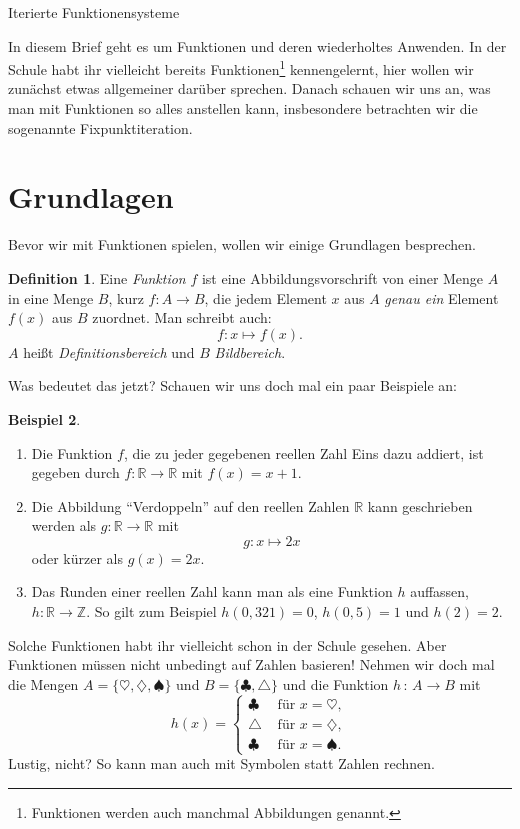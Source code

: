 \documentclass[a4paper,ngerman,12pt]{zirkelblatt1415}
\theoremstyle{definition}
\newtheorem{definition}{Definition}
\newtheorem{beispiel}[definition]{Beispiel}
\theoremstyle{remark}
\newcommand{\RR}{\mathbb{R}}
\newcommand{\lra}{\longrightarrow}
\begin{document}
\begin{center}\Large{Iterierte Funktionensysteme}\end{center}

In diesem Brief geht es um Funktionen und deren wiederholtes Anwenden. 
In der Schule habt ihr vielleicht bereits Funktionen\footnote{Funktionen werden auch manchmal Abbildungen genannt.} kennengelernt,
hier wollen wir zunächst etwas allgemeiner darüber sprechen. 
Danach schauen wir uns an, was man mit Funktionen so alles anstellen kann, insbesondere betrachten wir die sogenannte Fixpunktiteration.

\section{Grundlagen}

Bevor wir mit Funktionen spielen, wollen wir einige Grundlagen besprechen.
\begin{definition}
Eine \emph{Funktion} $f$ ist eine Abbildungsvorschrift von einer Menge $A$ in eine Menge $B$, kurz $f:A\rightarrow B$, die jedem Element $x$ aus $A$ \emph{genau ein} Element $f(x)$ aus $B$ zuordnet.
Man schreibt auch:
\[
f: x \mapsto f(x). 
\]
$A$ hei{\ss}t \emph{Definitionsbereich} und $B$ \emph{Bildbereich}.
\end{definition}

Was bedeutet das jetzt? Schauen wir uns doch mal ein paar Beispiele an:
\begin{beispiel}
\begin{enumerate}
\item Die Funktion $f$, die zu jeder gegebenen reellen Zahl Eins dazu addiert, ist gegeben durch $f:\RR\lra\RR$ mit $f(x)=x+1$.
\item Die Abbildung "`Verdoppeln"' auf den reellen Zahlen $\mathbb{R}$ kann geschrieben werden als $g:\mathbb{R}\rightarrow\mathbb{R}$ mit
\[
g : x \mapsto 2x
\]
oder kürzer als $g(x)=2x$.
\item Das Runden einer reellen Zahl kann man als eine Funktion $h$ auffassen, $h:\mathbb{R}\longrightarrow\mathbb{Z}$. So gilt zum Beispiel $h(0,321)=0$, $h(0,5)=1$ und $h(2)=2$. 
\end{enumerate}
\end{beispiel}
Solche Funktionen habt ihr vielleicht schon in der Schule gesehen. Aber Funktionen müssen nicht unbedingt auf Zahlen basieren!
Nehmen wir doch mal die Mengen $A = \{ \heartsuit, \diamondsuit, \spadesuit \}$ und $B = \{\clubsuit, \triangle \}$ und die Funktion $h \,:\, A \to B$ mit 
\[ h(x) =\begin{cases} 
      \clubsuit & \text{ für } x = \heartsuit, \\
      \triangle  & \text{ für } x = \diamondsuit, \\
      \clubsuit & \text{ für } x = \spadesuit.  
  \end{cases}
\]
Lustig, nicht? So kann man auch mit Symbolen statt Zahlen rechnen.
\end{document}
